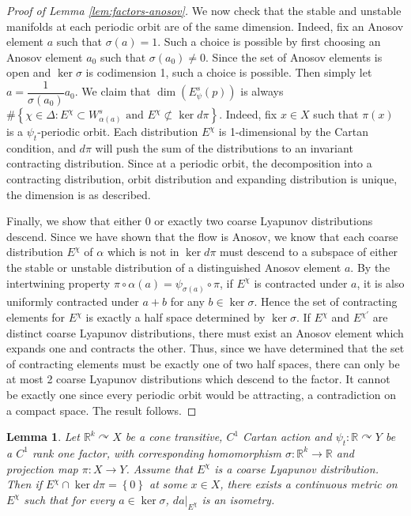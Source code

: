 \documentclass[12pt]{amsart}
\newtheorem{lemma}[theorem]{Lemma}
\theoremstyle{definition}
\theoremstyle{remark}
\numberwithin{equation}{section}
\newcommand{\R}{\mathbb{R}}
\newcommand{\set}[1]{\left\lbrace #1 \right\rbrace}
\newcommand{\of}{\circ}
\newtheorem{Structural Stability Theorem}[theorem]{Structural Stability Theorem}
\begin{document}
{\begin{proof}[Proof of Lemma \ref{lem:factors-anosov}]
 We now check that the stable and unstable manifolds at each periodic orbit are of the same dimension. Indeed, fix an Anosov element $a$ such that $\sigma(a) = 1$. Such a choice is possible by first choosing an Anosov element $a_0$ such that $\sigma(a_0) \not= 0$. Since the set of Anosov elements is open and $\ker \sigma$ is codimension 1, such a choice is possible. Then simply let $a = \dfrac{1}{\sigma(a_0)}a_0$. We claim that $\dim(E^s_{\psi}(p))$ is always $\#\set{\chi \in \Delta : E^\chi \subset W^s_{\alpha(a)} \mbox{ and } E^\chi \not\subset \ker d\pi}$. Indeed, fix $x \in X$ such that $\pi(x)$ is a $\psi_t$-periodic orbit. Each distribution $E^\chi$ is 1-dimensional by the Cartan condition, and $d\pi$ will push the sum of the distributions to an invariant contracting distribution. Since at a periodic orbit, the decomposition into a contracting distribution, orbit distribution and expanding distribution is unique, the dimension is as described. 
 
 Finally, we show that either 0 or exactly two coarse Lyapunov distributions descend. Since we have shown that the flow is Anosov, we know that each coarse distribution $E^\chi$ of $\alpha$ which is not in $\ker d\pi$ must descend to a subspace of either the stable or unstable distribution of a distinguished Anosov element $a$. By the intertwining property $\pi \of \alpha(a) = \psi_{\sigma(a)} \of \pi$, if $E^\chi$ is contracted under $a$, it is also uniformly contracted under $a + b$ for any $b \in \ker \sigma$. Hence the set of contracting elements for $E^\chi$ is exactly a half space determined by $\ker \sigma$. If $E^\chi$ and $E^{\chi'}$ are distinct coarse Lyapunov distributions, there must exist an Anosov element which expands one and contracts the other. Thus, since we have determined that the set of contracting elements must be exactly one of two half spaces, there can only be at most 2 coarse Lyapunov distributions which descend to the factor. It cannot be exactly one since every periodic orbit would be attracting, a contradiction on a compact space. The result follows.
\end{proof}
}

\begin{lemma}
\label{lem:collapse-coarses}
Let $\R^k \curvearrowright X$ be a {  cone} transitive, $C^1$ Cartan action and $\psi_t : \R \curvearrowright Y$ be a $C^1$ rank one factor, with corresponding homomorphism $\sigma : \R^k \to \R$ and projection map $\pi : X \to Y$. Assume that $E^\chi$ is a coarse Lyapunov distribution. Then if $E^\chi  \cap \ker d\pi = \set{0}$ at some $x \in X$, there exists a continuous metric on $E^\chi$ such that for every $a \in \ker \sigma$, $da|_{E^\chi}$ is an isometry.
\end{lemma}
\end{document}
